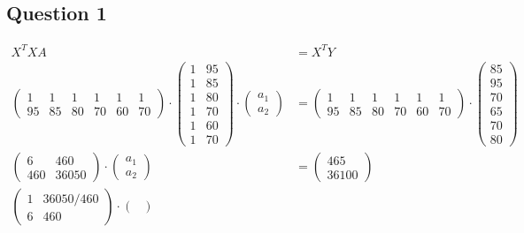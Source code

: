 \subsection{Question 1}

\begin{equation}
	\begin{aligned}
		X^TXA &= X^TY\\
		\begin{pmatrix}
			1 & 1 & 1 & 1 & 1 & 1\\
			95 & 85 & 80 & 70 & 60 & 70
		\end{pmatrix}
		\cdot
		\begin{pmatrix}
			1 & 95 \\
			1 & 85 \\
			1 & 80 \\
			1 & 70 \\
			1 & 60 \\
			1 & 70 
		\end{pmatrix}
		\cdot
		\begin{pmatrix}
			a_1\\
			a_2
		\end{pmatrix}
		&=
		\begin{pmatrix}
			1 & 1 & 1 & 1 & 1 & 1\\
			95 & 85 & 80 & 70 & 60 & 70
		\end{pmatrix}
		\cdot
		\begin{pmatrix}
			85\\
			95\\
			70\\
			65\\
			70\\
			80
		\end{pmatrix}\\
		\begin{pmatrix}
			6 & 460\\
			460 & 36050
		\end{pmatrix}
		\cdot
		\begin{pmatrix}
			a_1\\
			a_2
		\end{pmatrix}
		&=
		\begin{pmatrix}
			465\\
			36100
		\end{pmatrix}\\
		\begin{pmatrix}
			1 & 36050/460\\
			6 & 460
		\end{pmatrix}
		\cdot
		\begin{pmatrix}

\end{pmatrix}
\end{aligned}
\end{equation}
